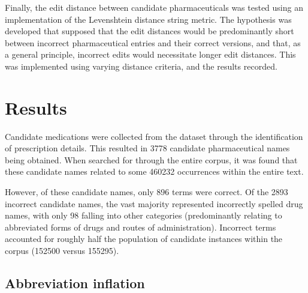 Finally, the edit distance between candidate pharmaceuticals was tested using an implementation of the Levenshtein distance string metric.\cite{schulz2002fast} The hypothesis was developed that supposed that the edit distances would be predominantly short between incorrect pharmaceutical entries and their correct versions, and that, as a general principle, incorrect edits would necessitate longer edit distances.\cite{hodge2003comparison}  This was implemented using varying distance criteria, and the results recorded.




\section{Results}

Candidate medications were collected from the dataset through the identification of prescription details. This resulted in 3778 candidate pharmaceutical names being obtained. When searched for through the entire corpus, it was found that these candidate names related to some 460232 occurrences within the entire text.  

However, of these candidate names, only 896 terms were correct. Of the 2893 incorrect candidate names, the vast majority represented incorrectly spelled drug names, with only 98 falling into other categories (predominantly relating to abbreviated forms of drugs and routes of administration). Incorrect terms accounted for roughly half the population of candidate instances within the corpus (152500 versus 155295).


\subsection{Abbreviation inflation}

